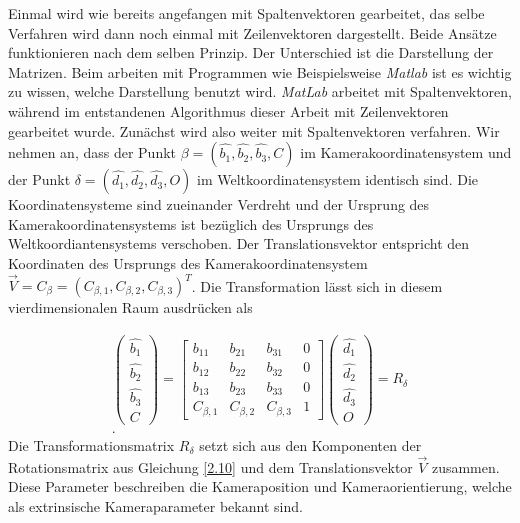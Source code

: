 Einmal wird wie bereits angefangen mit Spaltenvektoren gearbeitet, das selbe Verfahren wird dann noch einmal mit Zeilenvektoren dargestellt.  Beide Ansätze funktionieren nach dem selben Prinzip. Der Unterschied ist die Darstellung der Matrizen. Beim arbeiten mit Programmen wie Beispielsweise \textit{Matlab} ist es wichtig zu wissen, welche Darstellung benutzt wird. \textit{MatLab} arbeitet mit Spaltenvektoren, während im entstandenen Algorithmus dieser Arbeit mit Zeilenvektoren gearbeitet wurde. Zunächst wird also weiter mit Spaltenvektoren verfahren. 
Wir nehmen an, dass der Punkt  $\beta = (\hat{b_1},\hat{b_2},\hat{b_3},C)$ im Kamerakoordinatensystem und der Punkt $\delta = (\hat{d_1},\hat{d_2},\hat{d_3},O)$ im Weltkoordinatensystem identisch sind. Die Koordinatensysteme sind zueinander Verdreht und der Ursprung des Kamerakoordinatensystems ist bezüglich des Ursprungs des Weltkoordiantensystems verschoben. Der Translationsvektor entspricht den Koordinaten des Ursprungs des Kamerakoordinatensystem $\vec{V} = C_\beta = (C_{\beta,1}, C_{\beta,2}, C_{\beta,3})^T$. Die Transformation lässt sich in diesem vierdimensionalen Raum ausdrücken als  

\begin{gather}
	\begin{pmatrix}
		\hat{b_1}\\
		\hat{b_2}\\
		\hat{b_3}\\
		C
	\end{pmatrix} = 
	\begin{bmatrix}
		b_{11} & b_{21} & b_{31} & 0\\
		b_{12} & b_{22} & b_{32} & 0\\
		b_{13} & b_{23} & b_{33} & 0\\
		C_{\beta,1} & C_{\beta,2} & C_{\beta,3} & 1 
	\end{bmatrix}
	\begin{pmatrix}
		\hat{d_1}\\
		\hat{d_2}\\
		\hat{d_3}\\
		O
	\end{pmatrix}
	= R_\delta\\.
\end{gather}
Die Transformationsmatrix $R_\delta$ setzt sich aus den Komponenten der Rotationsmatrix aus Gleichung \ref{2.10} und dem Translationsvektor $\vec{V}$ zusammen. Diese Parameter beschreiben die Kameraposition und Kameraorientierung, welche als extrinsische Kameraparameter bekannt sind.    

